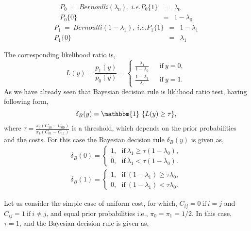 \documentclass[12pt]{report}
\begin{document}
\begin{itemize}
\begin{exmp}
\begin{figure}[h]
\label{fig:binarychannel}
\end{figure}
\begin{eqnarray}
\nonumber
P_0~=~Bernoulli\left(\lambda_0\right),~i.e. P_0\{1\}&=&\lambda_0\\
\nonumber
P_0\{0\}&=&1-\lambda_0
\end{eqnarray}
\begin{eqnarray}
\nonumber
P_1~=~Bernoulli\left(1-\lambda_1\right),~i.e. P_1\{1\}&=&1-\lambda_1\\
\nonumber
P_1\{0\}&=&\lambda_1
\end{eqnarray}
\par The corresponding likelihood ratio is,
\begin{equation}
\nonumber
L(y) = \frac{p_1(y)}{p_0(y)} = 
\begin{cases}
	\frac{\lambda_1}{1-\lambda_0} ~~~~~~~\mbox{if}~ y=0, \\
	 \frac{1-\lambda_1}{\lambda_0} ~~~~~~~\mbox{if}~ y=1.
\end{cases}
\end{equation}
As we have already seen that Bayesian decision rule is liklihood ratio test, having following form,
\begin{equation}
\nonumber
\delta_B(y)=\mathbbm{1}~{\{L(y)\geq \tau\}},
\end{equation}
where $\tau= \frac{\pi_0(C_{10}-C_{00})}{\pi_1(C_{01}-C_{11})}$ is a threshold, which depends on the prior probabilities and the costs. For this case the Bayesian decision rule $\delta_{B}(y)$ is given as,
\begin{eqnarray}
\nonumber
\delta_{B}(0)=
\begin{cases}
1,~~~\mbox{if}~\lambda_1\geq\tau(1-\lambda_0),\\ 
0,~~~\mbox{if}~\lambda_1<\tau(1-\lambda_0).
\end{cases}\\ \nonumber
\delta_{B}(1)=\begin{cases}
1,~~~\mbox{if}~(1-\lambda_1)\geq\tau\lambda_0,\\
0,~~~\mbox{if}~(1-\lambda_1)<\tau\lambda_0.
\end{cases}
\end{eqnarray}
\par Let us consider the simple case of uniform cost, for which, $C_{ij} = 0~ \mbox{if}~ i=j$ and $C_{ij} = 1~ \mbox{if} ~i\neq j$, and equal prior probabilities i.e.,  $\pi_0=\pi_1=1/2$. In this case, $\tau=1$, and the Bayesian decision rule is given as,
\begin{eqnarray}

\end{eqnarray}
\end{exmp}
\end{itemize}
\end{document}
